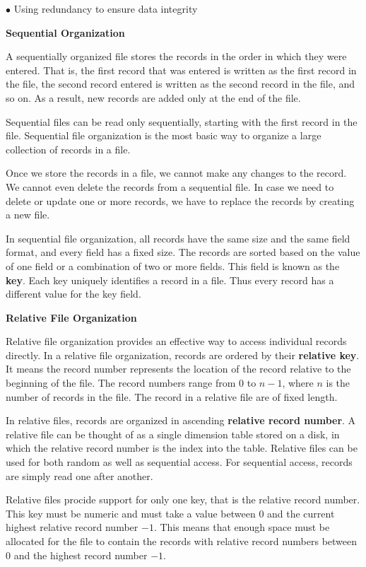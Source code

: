 \vskip 3mm
\qquad$\bullet$ Using redundancy to ensure data integrity

\filbreak
\vskip 1cm
{\bf Sequential Organization}

\vskip 1mm
A sequentially organized file stores the records in the order in which they were entered. That is, the first record that was entered is written as the first record in the file, the second record entered is written as the second record in the file, and so on. As a result, new records are added only at the end of the file.

\vskip 1mm
Sequential files can be read only sequentially, starting with the first record in the file. Sequential file organization is the most basic way to organize a large collection of records in a file.

\vskip 1mm
Once we store the records in a file, we cannot make any changes to the record. We cannot even delete the records from a sequential file. In case we need to delete or update one or more records, we have to replace the records by creating a new file.

\vskip 1mm
In sequential file organization, all records have the same size and the same field format, and every field has a fixed size. The records are sorted based on the value of one field or a combination of two or more fields. This field is known as the {\bf key}. Each key uniquely identifies a record in a file. Thus every record has a different value for the key field.

\filbreak
\vskip 1cm
{\bf Relative File Organization}

\vskip 1mm
Relative file organization provides an effective way to access individual records directly. In a relative file organization, records are ordered by their {\bf relative key}. It means the record number represents the location of the record relative to the beginning of the file. The record numbers range from $0$ to $n-1$, where $n$ is the number of records in the file. The record in a relative file are of fixed length.

\vskip 1mm
In relative files, records are organized in ascending {\bf relative record number}. A relative file can be thought of as a single dimension table stored on a disk, in which the relative record number is the index into the table. Relative files can be used for both random as well as sequential access. For sequential access, records are simply read one after another.

\vskip 1mm
Relative files procide support for only one key, that is the relative record number. This key must be numeric and must take a value between $0$ and the current highest relative record number $-1$. This means that enough space must be allocated for the file to contain the records with relative record numbers between $0$ and the highest record number $-1$.

